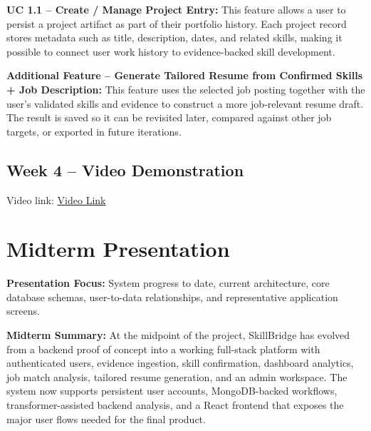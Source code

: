 \documentclass[11pt]{article}
\begin{document}
\noindent
\textbf{UC 1.1 -- Create / Manage Project Entry:}
This feature allows a user to persist a project artifact as part of their portfolio history. Each project record stores metadata such as title, description, dates, and related skills, making it possible to connect user work history to evidence-backed skill development.

\noindent
\textbf{Additional Feature -- Generate Tailored Resume from Confirmed Skills + Job Description:}
This feature uses the selected job posting together with the user’s validated skills and evidence to construct a more job-relevant resume draft. The result is saved so it can be revisited later, compared against other job targets, or exported in future iterations.

\subsection*{Week 4 -- Video Demonstration}
\noindent
Video link: \href{https://www.loom.com/share/5e02115145c841f9a0e833ab8cc311f8}{Video Link}

\clearpage
\section*{Midterm Presentation}

\noindent\textbf{Presentation Focus:} System progress to date, current architecture, core database schemas, user-to-data relationships, and representative application screens.

\vspace{0.5em}
\noindent\textbf{Midterm Summary:}
At the midpoint of the project, SkillBridge has evolved from a backend proof of concept into a working full-stack platform with authenticated users, evidence ingestion, skill confirmation, dashboard analytics, job match analysis, tailored resume generation, and an admin workspace. The system now supports persistent user accounts, MongoDB-backed workflows, transformer-assisted backend analysis, and a React frontend that exposes the major user flows needed for the final product.
\end{document}
